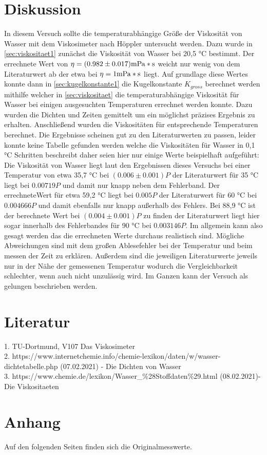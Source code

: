 \section{Diskussion}
\label{sec:diskussion}
In diesem Versuch sollte die temperaturabhängige Größe der Viskosität von Wasser mit dem Viskosimeter 
nach Höppler untersucht werden. Dazu wurde in \autoref{sec:viskositaet1} zunächst die Viskosität von Wasser
bei 20,5 °C bestimmt. Der errechnete Wert von $\eta=(0.982\pm0.017)\si[]{mPa*s}$ weicht nur wenig von dem Literaturwert 
ab der etwa bei $\eta=1\si[]{mPa*s}$ liegt. Auf grundlage diese Wertes konnte dann in \autoref{sec:kugelkonstante1}
die Kugelkonstante $K_{gross}$ berechnet werden mithilfe welcher in \autoref{sec:viskositaet} die temperaturabhängige
Viskosität für Wasser bei einigen ausgesuchten Temperaturen errechnet werden konnte. Dazu wurden die Dichten und
Zeiten gemittelt um ein möglichst präzises Ergebnis zu erhalten. Anschließend wurden die Viskositäten für entsprechende
Temperaturen berechnet. Die Ergebnisse scheinen gut zu den Literaturwerten zu passen, leider konnte keine Tabelle
gefunden werden welche die Viskositäten für Wasser in 0,1 °C Schritten beschreibt daher seien hier nur einige Werte 
beispielhaft aufgeführt: Die Viskosität von Wasser liegt laut den Ergebnissen dieses Versuchs bei einer Temperatur
von etwa 35,7 °C bei $(0.006\pm 0.001) P$ der Literaturwert für 35 °C liegt bei $0.00719 P$ und damit nur knapp neben dem Fehlerband.
Der errechneteWert für etwa 59,2 °C liegt bei $0.005 P$ der Literaturwert für 60 °C bei $0.004666 P$ und damit ebenfalls
nur knapp außerhalb des Fehlers. Bei 88,9 °C ist der berechnete Wert bei $(0.004\pm0.001) P$ zu finden der Literaturwert
liegt hier sogar innerhalb des Fehlerbandes für 90 °C bei $0.003146 P$. Im allgemein kann also gesagt werden das 
die errechneten Werte durchaus realistisch sind. Mögliche Abweichungen sind mit dem großen Ablesefehler bei der
Temperatur und beim messen der Zeit zu erklären. Außerdem sind die jeweiligen Literaturwerte jeweils nur in der
Nähe der gemessenen Temperatur wodurch die Vergleichbarkeit schlechter, wenn auch nicht unzulässig wird. Im Ganzen
kann der Versuch als gelungen beschrieben werden.
\section{Literatur}
\label{sec:literatur}
1. TU-Dortmund, V107 Das Viskosimeter\\
2. https://www.internetchemie.info/chemie-lexikon/daten/w/wasser-dichtetabelle.php (07.02.2021) - Die Dichten von Wasser\\
3. https://www.chemie.de/lexikon/Wasser\_\%28Stoffdaten\%29.html (08.02.2021)- Die Viskositaeten
\section{Anhang}
\label{sec:anhang}
Auf den folgenden Seiten finden sich die Originalmesswerte.